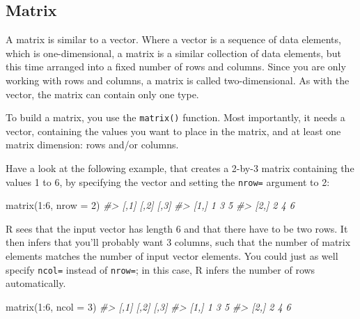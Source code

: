 \documentclass[
]{book}
\newenvironment{Shaded}{\begin{snugshade}}{\end{snugshade}}
\newcommand{\AttributeTok}[1]{\textcolor[rgb]{0.77,0.63,0.00}{#1}}
\newcommand{\CommentTok}[1]{\textcolor[rgb]{0.56,0.35,0.01}{\textit{#1}}}
\newcommand{\DecValTok}[1]{\textcolor[rgb]{0.00,0.00,0.81}{#1}}
\newcommand{\FunctionTok}[1]{\textcolor[rgb]{0.00,0.00,0.00}{#1}}
\newcommand{\NormalTok}[1]{#1}
\newcommand{\SpecialCharTok}[1]{\textcolor[rgb]{0.00,0.00,0.00}{#1}}
\begin{document}
\hypertarget{matrix}{%
\subsection{Matrix}\label{matrix}}

A matrix is similar to a vector. Where a vector is a sequence of data elements, which is one-dimensional, a matrix is a similar collection of data elements, but this time arranged into a fixed number of rows and columns. Since you are only working with rows and columns, a matrix is called two-dimensional. As with the vector, the matrix can contain only one type.

To build a matrix, you use the \texttt{matrix()} function. Most importantly, it needs a vector, containing the values you want to place in the matrix, and at least one matrix dimension: rows and/or columns.

Have a look at the following example, that creates a 2-by-3 matrix containing the values 1 to 6, by specifying the vector and setting the \texttt{nrow=} argument to 2:

\begin{Shaded}
\begin{Highlighting}[]
\FunctionTok{matrix}\NormalTok{(}\DecValTok{1}\SpecialCharTok{:}\DecValTok{6}\NormalTok{, }\AttributeTok{nrow =} \DecValTok{2}\NormalTok{)}
\CommentTok{\#\textgreater{}      [,1] [,2] [,3]}
\CommentTok{\#\textgreater{} [1,]    1    3    5}
\CommentTok{\#\textgreater{} [2,]    2    4    6}
\end{Highlighting}
\end{Shaded}

R sees that the input vector has length 6 and that there have to be two rows. It then infers that you'll probably want 3 columns, such that the number of matrix elements matches the number of input vector elements. You could just as well specify \texttt{ncol=} instead of \texttt{nrow=}; in this case, R infers the number of rows automatically.

\begin{Shaded}
\begin{Highlighting}[]
\FunctionTok{matrix}\NormalTok{(}\DecValTok{1}\SpecialCharTok{:}\DecValTok{6}\NormalTok{, }\AttributeTok{ncol =} \DecValTok{3}\NormalTok{)}
\CommentTok{\#\textgreater{}      [,1] [,2] [,3]}
\CommentTok{\#\textgreater{} [1,]    1    3    5}
\CommentTok{\#\textgreater{} [2,]    2    4    6}
\end{Highlighting}
\end{Shaded}
\end{document}
